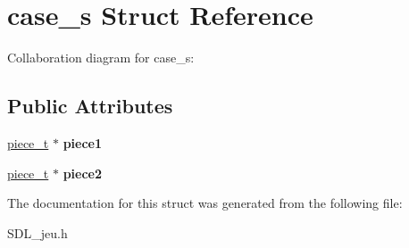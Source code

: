 \hypertarget{structcase__s}{}\section{case\+\_\+s Struct Reference}
\label{structcase__s}


Collaboration diagram for case\+\_\+s\+:
\subsection*{Public Attributes}
\begin{DoxyCompactItemize}
\item 
\mbox{\label{structcase__s_a35d0f6ee2289f9c283a33446b3b2528f}} 
\hyperlink{structpiece__s}{piece\+\_\+t} $\ast$ {\bfseries piece1}
\item 
\mbox{\label{structcase__s_a548417c5b6f823d5a4fd3ec3045d2ae3}} 
\hyperlink{structpiece__s}{piece\+\_\+t} $\ast$ {\bfseries piece2}
\end{DoxyCompactItemize}


The documentation for this struct was generated from the following file\+:\begin{DoxyCompactItemize}
\item 
S\+D\+L\+\_\+jeu.\+h\end{DoxyCompactItemize}
